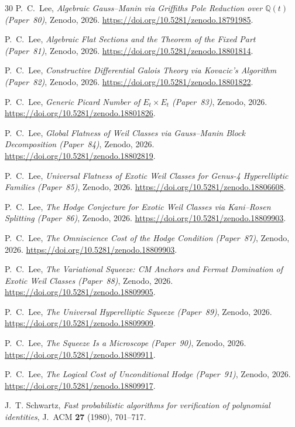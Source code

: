 \documentclass[11pt]{article}
\theoremstyle{plain}
\theoremstyle{definition}
\theoremstyle{remark}
\newcommand{\QQ}{\mathbb{Q}}
\begin{document}
\begin{thebibliography}{30}
P.~C.~Lee,
\emph{Algebraic Gauss--Manin via Griffiths Pole Reduction over $\QQ(t)$
(Paper~80)},
Zenodo, 2026.
\url{https://doi.org/10.5281/zenodo.18791985}.

P.~C.~Lee,
\emph{Algebraic Flat Sections and the Theorem of the Fixed Part (Paper~81)},
Zenodo, 2026.
\url{https://doi.org/10.5281/zenodo.18801814}.

P.~C.~Lee,
\emph{Constructive Differential Galois Theory via Kovacic's Algorithm
(Paper~82)},
Zenodo, 2026.
\url{https://doi.org/10.5281/zenodo.18801822}.

P.~C.~Lee,
\emph{Generic Picard Number of $E_t \times E_t$ (Paper~83)},
Zenodo, 2026.
\url{https://doi.org/10.5281/zenodo.18801826}.

P.~C.~Lee,
\emph{Global Flatness of Weil Classes via Gauss--Manin Block Decomposition
(Paper~84)},
Zenodo, 2026.
\url{https://doi.org/10.5281/zenodo.18802819}.

P.~C.~Lee,
\emph{Universal Flatness of Exotic Weil Classes for Genus-4 Hyperelliptic
Families (Paper~85)},
Zenodo, 2026.
\url{https://doi.org/10.5281/zenodo.18806608}.

P.~C.~Lee,
\emph{The Hodge Conjecture for Exotic Weil Classes via Kani--Rosen
Splitting (Paper~86)},
Zenodo, 2026.
\url{https://doi.org/10.5281/zenodo.18809903}.

P.~C.~Lee,
\emph{The Omniscience Cost of the Hodge Condition (Paper~87)},
Zenodo, 2026.
\url{https://doi.org/10.5281/zenodo.18809903}.

P.~C.~Lee,
\emph{The Variational Squeeze: CM Anchors and Fermat Domination of Exotic
Weil Classes (Paper~88)},
Zenodo, 2026.
\url{https://doi.org/10.5281/zenodo.18809905}.

P.~C.~Lee,
\emph{The Universal Hyperelliptic Squeeze (Paper~89)},
Zenodo, 2026.
\url{https://doi.org/10.5281/zenodo.18809909}.

P.~C.~Lee,
\emph{The Squeeze Is a Microscope (Paper~90)},
Zenodo, 2026.
\url{https://doi.org/10.5281/zenodo.18809911}.

P.~C.~Lee,
\emph{The Logical Cost of Unconditional Hodge (Paper~91)},
Zenodo, 2026.
\url{https://doi.org/10.5281/zenodo.18809917}.

J.~T. Schwartz,
\emph{Fast probabilistic algorithms for verification of polynomial
identities},
J.~ACM \textbf{27} (1980), 701--717.


\end{thebibliography}
\end{document}
